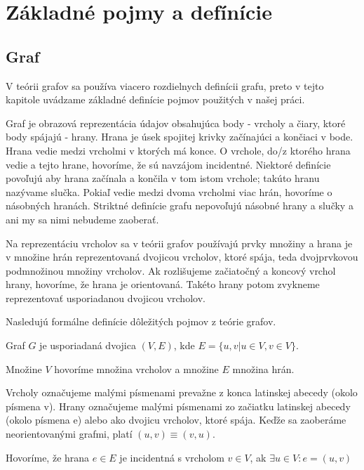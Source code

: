 \chapter{Základné pojmy a defínície}
\thispagestyle{empty}


\section{Graf}
V teórii grafov sa používa viacero rozdielnych definícii grafu, preto v
tejto kapitole uvádzame základné definície pojmov použitých v našej práci.

Graf je obrazová reprezentácia údajov obsahujúca body - vrcholy a čiary,
ktoré body spájajú - hrany. Hrana je úsek spojitej krivky začínajúci a 
končiaci v bode. Hrana vedie medzi vrcholmi v ktorých má konce.
O vrchole, do/z ktorého hrana vedie a tejto hrane, hovoríme, 
že sú navzájom incidentné. Niektoré definície povoľujú aby hrana začínala a 
končila v tom istom vrchole; takúto hranu nazývame slučka. 
Pokiaľ vedie medzi dvoma vrcholmi viac hrán, hovoríme o násobných hranách. 
Striktné definície grafu nepovoľujú násobné hrany a slučky a ani my sa nimi 
nebudeme zaoberať.

Na reprezentáciu vrcholov sa v teórii grafov používajú prvky množiny a 
hrana je v množine 
hrán reprezentovaná dvojicou vrcholov, ktoré spája, teda dvojprvkovou
podmnožinou množiny vrcholov. Ak rozlišujeme začiatočný a koncový vrchol
hrany, hovoríme, že hrana je orientovaná. Takéto hrany potom zvykneme
reprezentovať usporiadanou dvojicou vrcholov.

Nasledujú formálne definície dôležitých pojmov z teórie grafov.

\begin{defin}
Graf $G$ je usporiadaná dvojica $(V,E)$, kde
$E = \{u,v | u \in V, v \in V\}$.

Množine $V$ hovoríme množina vrcholov a množine $E$ množina hrán.

Vrcholy označujeme malými písmenami prevažne z konca latinskej abecedy 
(okolo písmena v). Hrany označujeme malými písmenami zo začiatku latinskej 
abecedy (okolo písmena e) alebo ako dvojicu vrcholov, ktoré spája. Keďže sa
zaoberáme neorientovanými grafmi, platí
$(u,v) \equiv (v,u)$.
\end{defin}

\begin{defin}
Hovoríme, že hrana $e \in E$ je incidentná s vrcholom $v \in V$, ak
$\exists  u \in  V : e = (u,v) $
\end{defin}


